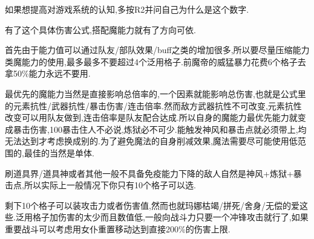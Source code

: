 {\color{red}如果想提高对游戏系统的认知,多按R2并问自己为什么是这个数字.}

\newpage

有了这个具体伤害公式,搭配魔能力就有了方向可依.

首先由于能力值可以通过队友/部队效果/buff之类的增加很多,所以要尽量压缩能力类魔能力的使用,最多最多不要超过4个泛用格子.前魔帝的威猛暴力花费6个格子去拿50\%能力永远不要用.

最优先的魔能力当然是直接影响总倍率的,一个因素就能影响总伤害,也就是公式里的元素抗性/武器抗性/暴击伤害/连击倍率.然而敌方武器抗性不可改变,元素抗性改变可以用队友做到,连击倍率是队友配合达成.所以自身的魔能力最优先能力就变成暴击伤害,100暴击住人不必说,炼狱必不可少.能触发神风和暴击点就必须带上,均无法达到才考虑换成别的.为了避免魔法的自身削减效果,魔法需要尽可能使用低范围的,最佳的当然是单体.

刷道具界/道具神或者其他一般不具备免疫能力下降的敌人自然是神风+炼狱+暴击点,所以实际上一般情况下你只有10个格子可以选.

剩下10个格子可以装攻击力或者伤害值,然而也就玛娜枯竭/拼死/舍身/无偿的爱这些.泛用格子加伤害的太少而且数值低,一般向战斗力只要一个冲锋攻击就行了,如果重要战斗可以考虑用女仆重置移动达到直接200\%的伤害上限.


